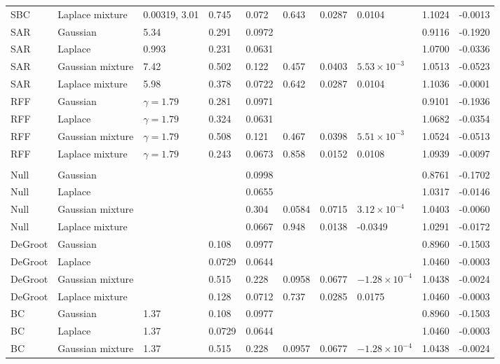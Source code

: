 \begin{longtable}{llllllllrr}
SBC & Laplace mixture & 0.00319, 3.01 & 0.745 & 0.072 & 0.643 & 0.0287 & 0.0104 & 1.1024 & -0.0013 \\
SAR & Gaussian & 5.34 & 0.291 & 0.0972 &  &  &  & 0.9116 & -0.1920 \\
SAR & Laplace & 0.993 & 0.231 & 0.0631 &  &  &  & 1.0700 & -0.0336 \\
SAR & Gaussian mixture & 7.42 & 0.502 & 0.122 & 0.457 & 0.0403 & $5.53\times10^{-3}$ & 1.0513 & -0.0523 \\
SAR & Laplace mixture & 5.98 & 0.378 & 0.0722 & 0.642 & 0.0287 & 0.0104 & 1.1036 & -0.0001 \\
RFF & Gaussian & $\gamma=1.79$ & 0.281 & 0.0971 &  &  &  & 0.9101 & -0.1936 \\
RFF & Laplace & $\gamma=1.79$ & 0.324 & 0.0631 &  &  &  & 1.0682 & -0.0354 \\
RFF & Gaussian mixture & $\gamma=1.79$ & 0.508 & 0.121 & 0.467 & 0.0398 & $5.51\times10^{-3}$ & 1.0524 & -0.0513 \\
RFF & Laplace mixture & $\gamma=1.79$ & 0.243 & 0.0673 & 0.858 & 0.0152 & 0.0108 & 1.0939 & -0.0097 \\
\midrule
\multicolumn{10}{l}{\senate{}} \\
Null & Gaussian &  &  & 0.0998 &  &  &  & 0.8761 & -0.1702 \\
Null & Laplace &  &  & 0.0655 &  &  &  & 1.0317 & -0.0146 \\
Null & Gaussian mixture &  &  & 0.304 & 0.0584 & 0.0715 & $3.12\times10^{-4}$ & 1.0403 & -0.0060 \\
Null & Laplace mixture &  &  & 0.0667 & 0.948 & 0.0138 & -0.0349 & 1.0291 & -0.0172 \\
DeGroot & Gaussian &  & 0.108 & 0.0977 &  &  &  & 0.8960 & -0.1503 \\
DeGroot & Laplace &  & 0.0729 & 0.0644 &  &  &  & 1.0460 & -0.0003 \\
DeGroot & Gaussian mixture &  & 0.515 & 0.228 & 0.0958 & 0.0677 & $-1.28\times10^{-4}$ & 1.0438 & -0.0024 \\
DeGroot & Laplace mixture &  & 0.128 & 0.0712 & 0.737 & 0.0285 & 0.0175 & 1.0460 & -0.0003 \\
BC & Gaussian & 1.37 & 0.108 & 0.0977 &  &  &  & 0.8960 & -0.1503 \\
BC & Laplace & 1.37 & 0.0729 & 0.0644 &  &  &  & 1.0460 & -0.0003 \\
BC & Gaussian mixture & 1.37 & 0.515 & 0.228 & 0.0957 & 0.0677 & $-1.28\times10^{-4}$ & 1.0438 & -0.0024 \\

\end{longtable}
